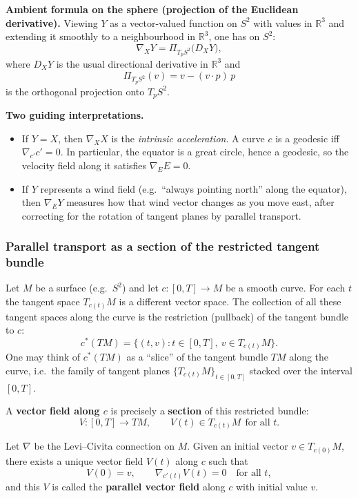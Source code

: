 \documentclass[12pt,a4paper]{article}
\theoremstyle{plain}
\theoremstyle{definition}      %
\begin{document}
\medskip
\textbf{Ambient formula on the sphere (projection of the Euclidean derivative).}
Viewing $Y$ as a vector-valued function on $S^2$ with values in $\mathbb{R}^3$ and extending it
smoothly to a neighbourhood in $\mathbb{R}^3$, one has on $S^2$:
\[
\nabla_X Y=\Pi_{T_pS^2}\bigl(D_X Y\bigr),
\]
where $D_XY$ is the usual directional derivative in $\mathbb{R}^3$ and
\[
\Pi_{T_pS^2}(v)=v-(v\cdot p)\,p
\]
is the orthogonal projection onto $T_pS^2$.

\medskip
\textbf{Two guiding interpretations.}
\begin{itemize}
	\item If $Y=X$, then $\nabla_XX$ is the \emph{intrinsic acceleration}. A curve $c$ is a geodesic iff
	$\nabla_{c'}c'=0$. In particular, the equator is a great circle, hence a geodesic, so the velocity
	field along it satisfies $\nabla_EE=0$.
	\item If $Y$ represents a wind field (e.g.\ ``always pointing north'' along the equator), then
	$\nabla_EY$ measures how that wind vector changes as you move east, after correcting for the
	rotation of tangent planes by parallel transport.
\end{itemize}

\subsubsection*{Parallel transport as a section of the restricted tangent bundle}

Let $M$ be a surface (e.g.\ $S^2$) and let $c:[0,T]\to M$ be a smooth curve.
For each $t$ the tangent space $T_{c(t)}M$ is a different vector space. The collection of all
these tangent spaces along the curve is the restriction (pullback) of the tangent bundle to $c$:
\[
c^{*}(TM)
=\{(t,v): t\in[0,T],\ v\in T_{c(t)}M\}.
\]
One may think of $c^{*}(TM)$ as a ``slice'' of the tangent bundle $TM$ along the curve, i.e.\ the
family of tangent planes $\{T_{c(t)}M\}_{t\in[0,T]}$ stacked over the interval $[0,T]$.

\medskip
A \textbf{vector field along $c$} is precisely a \textbf{section} of this restricted bundle:
\[
V:[0,T]\to TM,\qquad V(t)\in T_{c(t)}M \ \ \text{for all }t.
\]

\medskip
Let $\nabla$ be the Levi--Civita connection on $M$.
Given an initial vector $v\in T_{c(0)}M$, there exists a unique vector field $V(t)$ along $c$
such that
\[
V(0)=v,\qquad \nabla_{c'(t)}V(t)=0\quad\text{for all }t,
\]
and this $V$ is called the \textbf{parallel vector field} along $c$ with initial value $v$.
\end{document}
